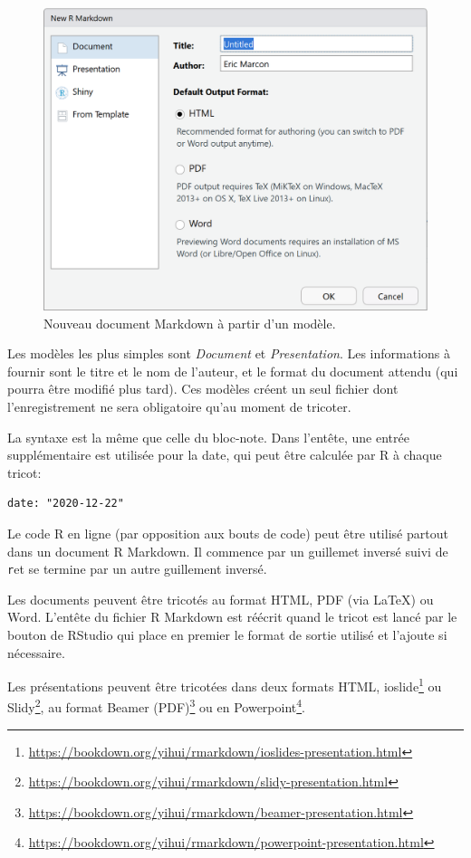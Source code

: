 \documentclass[
  11pt,
  french,
  a4paper,
  extrafontsizes,onecolumn,openright
  ]{memoir}
\begin{document}
\begin{figure}

{\centering \includegraphics[width=0.8\linewidth]{images/e-rmd1} 

}

\caption{Nouveau document Markdown à partir d'un modèle.}\label{fig:e-rmd1}
\end{figure}

\normalsize

Les modèles les plus simples sont \emph{Document} et \emph{Presentation}.
Les informations à fournir sont le titre et le nom de l'auteur, et le format du document attendu (qui pourra être modifié plus tard).
Ces modèles créent un seul fichier dont l'enregistrement ne sera obligatoire qu'au moment de tricoter.

La syntaxe est la même que celle du bloc-note.
Dans l'entête, une entrée supplémentaire est utilisée pour la date, qui peut être calculée par R à chaque tricot:

\begin{verbatim}
date: "2020-12-22"
\end{verbatim}

Le code R en ligne (par opposition aux bouts de code) peut être utilisé partout dans un document R Markdown.
Il commence par un guillemet inversé suivi de \texttt{r}et se termine par un autre guillement inversé.

Les documents peuvent être tricotés au format HTML, PDF (via LaTeX) ou Word.
L'entête du fichier R Markdown est réécrit quand le tricot est lancé par le bouton de RStudio qui place en premier le format de sortie utilisé et l'ajoute si nécessaire.

Les présentations peuvent être tricotées dans deux formats HTML, ioslide\footnote{\url{https://bookdown.org/yihui/rmarkdown/ioslides-presentation.html}} ou Slidy\footnote{\url{https://bookdown.org/yihui/rmarkdown/slidy-presentation.html}}, au format Beamer (PDF)\footnote{\url{https://bookdown.org/yihui/rmarkdown/beamer-presentation.html}} ou en Powerpoint\footnote{\url{https://bookdown.org/yihui/rmarkdown/powerpoint-presentation.html}}.
\end{document}
